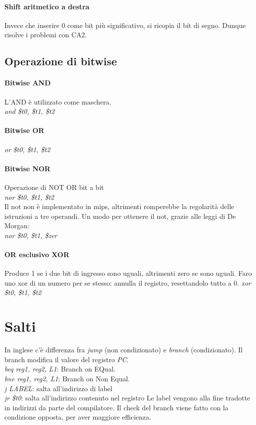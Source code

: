 \documentclass[class=book, crop=false]{standalone}
\begin{document}
\paragraph{Shift aritmetico a destra}
Invece che inserire 0 come bit più significativo, si ricopia il bit di segno. Dunque risolve i problemi con CA2.


\subsection{Operazione di bitwise}
\paragraph{Bitwise AND}
L'AND è utilizzato come maschera.\\
\emph{and \$t0, \$t1, \$t2}

\paragraph{Bitwise OR}
\emph{or \$t0, \$t1, \$t2}

\paragraph{Bitwise NOR}
Operazione di NOT OR bit a bit\\
\emph{nor \$t0, \$t1, \$t2}\\
Il not non è implementato in mips, altrimenti romperebbe la regolarità delle istruzioni a tre operandi. Un modo per ottenere il not, grazie alle leggi di De Morgan:\\
\emph{nor \$t0, \$t1, \$zer}

\paragraph{OR esclusivo XOR}
Produce 1 se i due bit di ingresso sono uguali, altrimenti zero se sono uguali. Faro uno xor di un numero per se stesso: annulla il registro, resettandolo tutto a 0.
\emph{xor \$t0, \$t1, \$t2}

\section{Salti}
In inglese c'è differenza fra \emph{jump} (non condizionato) e \emph{branch} (condizionato). Il branch modifica il valore del registro \emph{PC}.\\
\emph{beq reg1, reg2, L1}: Branch on EQual.\\
\emph{bne reg1, reg2, L1}: Branch on Non Equal.\\
\emph{j LABEL}: salta all'indirizzo di label\\
\emph{jr \$t0}: salta all'indirizzo contenuto nel registro
Le label vengono alla fine tradotte in indirizzi da parte del compilatore.
Il check del branch viene fatto con la condizione opposta, per aver maggiore efficienza.
\end{document}
